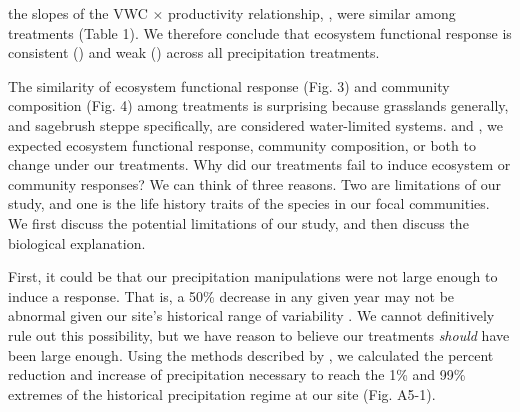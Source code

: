 \documentclass[fleqn,10pt,lineno]{wlpeerj} %
\begin{document}
the slopes of the VWC \(\times\) productivity relationship,
, were similar among treatments (Table 1). We
therefore conclude that ecosystem functional response is consistent
() and weak ()
across all precipitation treatments.

The similarity of ecosystem functional response (Fig. 3) and community
composition (Fig. 4) among treatments is surprising because grasslands
generally, and sagebrush steppe specifically, are considered
water-limited systems.  \citet{Huxman2004} and
\citet{Knapp2015}
\citet{Wilcox2017}
, we expected ecosystem functional
response, community composition, or both to change under our treatments.
Why did our treatments fail to induce ecosystem or community responses?
We can think of three reasons. Two are limitations of our study, and one
is the life history traits of the species in our focal communities. We
first discuss the potential limitations of our study, and then discuss
the biological explanation.

First, it could be that our precipitation manipulations were not large
enough to induce a response. That is, a 50\% decrease in any given year
may not be abnormal given our site's historical range of variability
\citep{Knapp2017}. We cannot definitively rule out this possibility, but
we have reason to believe our treatments \emph{should} have been large
enough. Using the methods described by \citet{Lemoine2016}, we
calculated the percent reduction and increase of 
precipitation necessary to reach the 1\% and 99\% extremes of the
historical precipitation regime at our site (Fig. A5-1).
\end{document}
